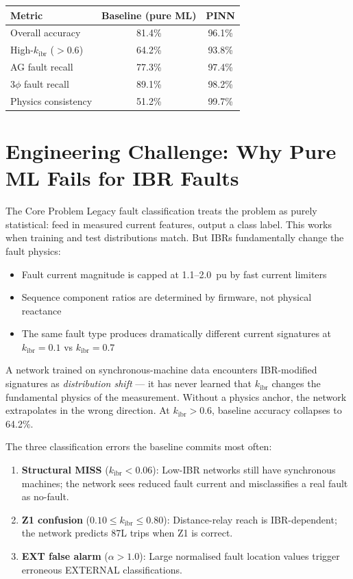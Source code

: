 \documentclass[12pt,a4paper]{article}
\newcommand{\kibr}{k_\mathrm{ibr}}
\begin{document}
\begin{center}
\begin{tabular}{@{}lcc@{}}
\toprule
\textbf{Metric} & \textbf{Baseline (pure ML)} & \textbf{PINN} \\
\midrule
Overall accuracy         & 81.4\%  & 96.1\%  \\
High-$\kibr$ ($>0.6$)   & 64.2\%  & 93.8\%  \\
AG fault recall          & 77.3\%  & 97.4\%  \\
3$\phi$ fault recall     & 89.1\%  & 98.2\%  \\
Physics consistency      & 51.2\%  & 99.7\%  \\
\bottomrule
\end{tabular}
\end{center}

\section{Engineering Challenge: Why Pure ML Fails for IBR Faults}

\begin{warnbox}{The Core Problem}
Legacy fault classification treats the problem as purely statistical: feed in measured current features, output a class label. This works when training and test distributions match. But IBRs fundamentally change the fault physics:

\begin{itemize}[nosep]
  \item Fault current magnitude is capped at 1.1--2.0~pu by fast current limiters
  \item Sequence component ratios are determined by firmware, not physical reactance
  \item The same fault type produces dramatically different current signatures at $\kibr = 0.1$ vs $\kibr = 0.7$
\end{itemize}

A network trained on synchronous-machine data encounters IBR-modified signatures as \textit{distribution shift} — it has never learned that $\kibr$ changes the fundamental physics of the measurement. Without a physics anchor, the network extrapolates in the wrong direction. At $\kibr > 0.6$, baseline accuracy collapses to 64.2\%.
\end{warnbox}

The three classification errors the baseline commits most often:
\begin{enumerate}[nosep]
  \item \textbf{Structural MISS} ($\kibr < 0.06$): Low-IBR networks still have synchronous machines; the network sees reduced fault current and misclassifies a real fault as no-fault.
  \item \textbf{Z1 confusion} ($0.10 \leq \kibr \leq 0.80$): Distance-relay reach is IBR-dependent; the network predicts 87L trips when Z1 is correct.
  \item \textbf{EXT false alarm} ($\alpha > 1.0$): Large normalised fault location values trigger erroneous EXTERNAL classifications.
\end{enumerate}
\end{document}
